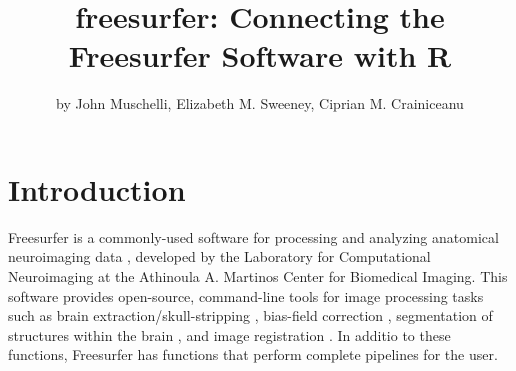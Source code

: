 \title{freesurfer: Connecting the Freesurfer Software with R}
\author{by John Muschelli, Elizabeth M. Sweeney, Ciprian M. Crainiceanu}

\maketitle


\section{Introduction}\label{introduction}

\label{sec:intro}

Freesurfer is a commonly-used software for processing and analyzing
anatomical neuroimaging data \citep{fischl2012freesurfer}, developed by
the Laboratory for Computational Neuroimaging at the Athinoula A.
Martinos Center for Biomedical Imaging. This software provides
open-source, command-line tools for image processing tasks such as brain
extraction/skull-stripping \citep{segonne2004hybrid}, bias-field
correction \citep{sled_nonparametric_1998}, segmentation of structures
within the brain \citep{fischl2002whole,fischl2004sequence}, and image
registration \citep{fischl1999high,reuter2010highly}. In additio to
these functions, Freesurfer has functions that perform complete
pipelines for the user.

